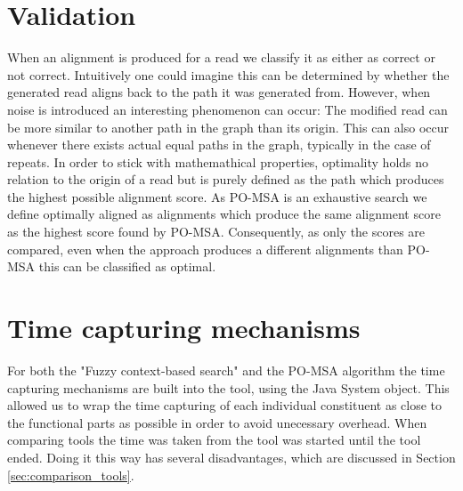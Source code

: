 \documentclass[thesis.tex]{subfiles}
\begin{document}
\section{Validation}
\label{sec:performance_validation}
When an alignment is produced for a read we classify it as either as correct or not correct. Intuitively one could imagine this can be determined by whether the generated read aligns back to the path it was generated from. However, when noise is introduced an interesting phenomenon can occur: The modified read can be more similar to another path in the graph than its origin. This can also occur whenever there exists actual equal paths in the graph, typically in the case of repeats. In order to stick with mathemathical properties, optimality holds no relation to the origin of a read but is purely defined as the path which produces the highest possible alignment score. As PO-MSA is an exhaustive search we define optimally aligned as alignments which produce the same alignment score as the highest score found by PO-MSA. Consequently, as only the scores are compared, even when the approach produces a different alignments than PO-MSA this can be classified as optimal.
\section{Time capturing mechanisms}
For both the "Fuzzy context-based search" and the PO-MSA algorithm the time capturing mechanisms are built into the tool, using the Java System object. This allowed us to wrap the time capturing of each individual constituent as close to the functional parts as possible in order to avoid unecessary overhead. When comparing tools the time was taken from the tool was started until the tool ended. Doing it this way has several disadvantages, which are discussed in Section \ref{sec:comparison_tools}.
\end{document}
